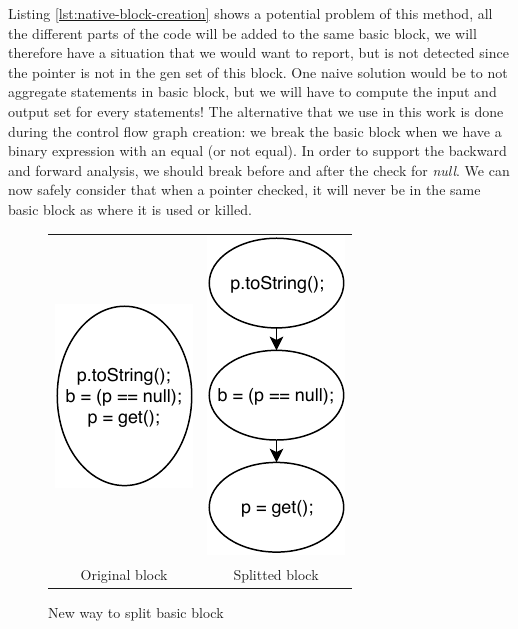 Listing \ref{lst:native-block-creation} shows a potential problem of this method, all the different parts of the code will be added to the same basic block, we will therefore have a situation that we would want to report, but is not detected since the pointer is not in the gen set of this block. 
One naive solution would be to not aggregate statements in basic block, but we will have to compute the input and output set for every statements! 
\newline
The alternative that we use in this work is done during the control flow graph creation: we break the basic block when we have a binary expression with an equal (or not equal). 
In order to support the backward and forward analysis, we should break before and after the check for \emph{null}. 
We can now safely consider that when a pointer checked, it will never be in the same basic block as where it is used or killed.
\begin{figure}[h]
\caption{New way to split basic block}
\label{figure:new-way-to-split}
\setlength{\tabcolsep}{24pt}
	\begin{tabular}{cc}
		\includegraphics[]{figure/original-block-cfg.pdf}  &
		\includegraphics[]{figure/splitted-block-cfg.pdf}   \\ 
		Original block & Splitted block
	\end{tabular}
\end{figure}

